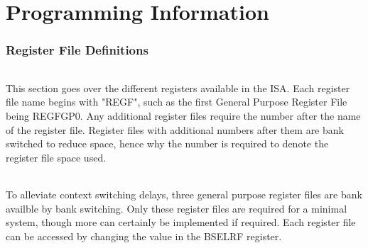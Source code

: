 \documentclass[letterpaper, 11pt]{article}
\begin{document}
\part{Programming Information}
\section{Register File Definitions}
\paragraph{}This section goes over the different registers available in the ISA. Each register file name begins with 
"REGF", such as the first General Purpose Register File being REGFGP0. Any additional register files require the number after the
name of the register file. Register files with additional numbers after them are bank switched to reduce space, hence why the number is
required to denote the register file space used.
\paragraph{}To alleviate context switching delays, three general purpose register files are bank availble by bank switching. Only these register files are required
for a minimal system, though more can certainly be implemented if required. Each register file can be accessed by changing the value in the BSELRF register. 
\end{document}
